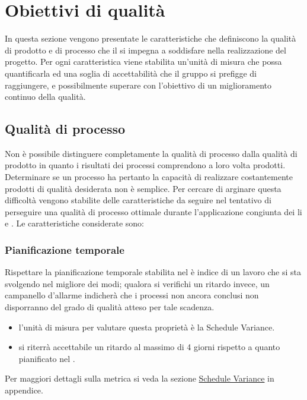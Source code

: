 \documentclass[a4paper, titlepage]{article}
\begin{document}
\newpage
\section{Obiettivi di qualità}
In questa sezione vengono presentate le caratteristiche che definiscono la qualità di prodotto e di processo che il  si impegna a soddisfare nella realizzazione del progetto. 
\newline Per ogni caratteristica viene stabilita un'unità di misura che possa quantificarla ed una soglia di accettabilità che il gruppo si prefigge di raggiungere, e possibilmente superare con l'obiettivo di un miglioramento continuo della qualità.

\subsection{Qualità di processo}
Non è possibile distinguere completamente la qualità di processo dalla qualità di prodotto in quanto i risultati dei processi comprendono a loro volta prodotti. Determinare se un processo ha pertanto la capacità di realizzare costantemente prodotti di qualità desiderata non è semplice. 
\newline Per cercare di arginare questa difficoltà vengono stabilite delle caratteristiche da seguire nel tentativo di perseguire una qualità di processo ottimale durante l'applicazione congiunta dei li  e .
\newline Le caratteristiche considerate sono:

\subsubsection{Pianificazione temporale}
Rispettare la pianificazione temporale stabilita nel  è indice di un lavoro che si sta svolgendo nel migliore dei modi; qualora si verifichi un ritardo invece, un campanello d'allarme indicherà che i processi non ancora conclusi non disporranno del grado di qualità atteso per tale scadenza.
\begin{itemize}
\item {} l'unità di misura per valutare questa proprietà è la Schedule Variance.
\item {} si riterrà accettabile un ritardo al massimo di 4 giorni rispetto a quanto pianificato nel .
\end{itemize}
Per maggiori dettagli sulla metrica si veda la sezione \hyperref[par:SV]{Schedule Variance} in appendice.
\end{document}
